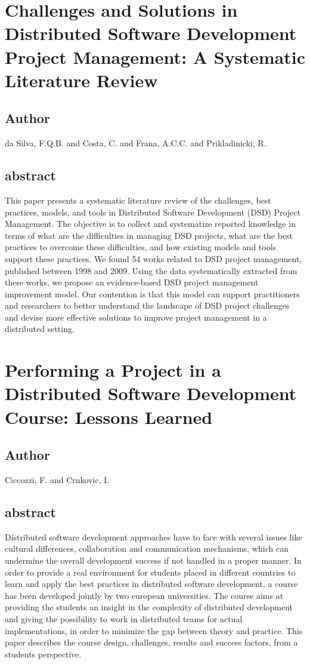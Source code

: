 \documentclass[lnbip,sechang,a4paper]{svmultln}
\begin{document}
\section{Challenges and Solutions in Distributed Software Development Project
Management: A Systematic Literature Review}
\subsection{Author}
da Silva, F.Q.B. and Costa, C. and Frana, A.C.C. and Prikladinicki, R.
\subsection{abstract}
This paper presents a systematic literature review of the challenges, best practices, models, and tools in Distributed Software Development (DSD) Project Management. The objective is to collect and systematize reported knowledge in terms of what are the difficulties in managing DSD projects, what are the best practices to overcome these difficulties, and how existing models and tools support these practices. We found 54 works related to DSD project management, published between 1998 and 2009. Using the data systematically extracted from these works, we propose an evidence-based DSD project management improvement model. Our contention is that this model can support practitioners and researchers to better understand the landscape of DSD project challenges and devise more effective solutions to improve project management in a distributed setting.
\cite{5581497}
\section{Performing a Project in a Distributed Software Development Course:
Lessons Learned}
\subsection{Author}
Ciccozzi, F. and Crnkovic, I.
\subsection{abstract}
Distributed software development approaches have to face with several issues
like cultural differences, collaboration and communication mechanisms, which can
undermine the overall development success if not handled in a proper manner. In order to provide a real environment for students placed in different countries to learn and apply the best practices in distributed software development, a course has been developed jointly by two european universities. The course aims at providing the students an insight in the complexity of distributed development and giving the possibility to work in distributed teams for actual implementations, in order to minimize the gap between theory and practice. This paper describes the course design, challenges, results and success factors, from a students perspective.
\cite{5581508}
\end{document}
